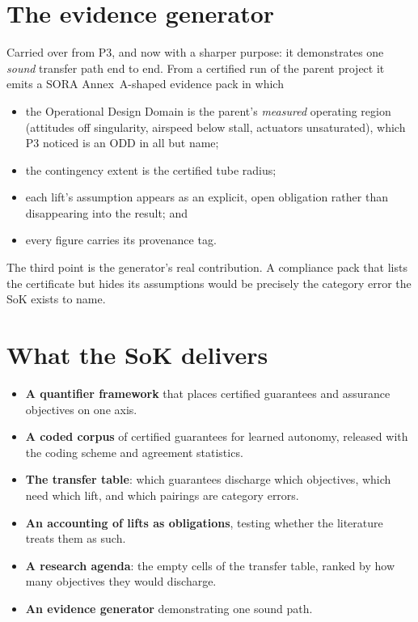 \documentclass[11pt,a4paper]{article}
\begin{document}
\section{The evidence generator}
Carried over from P3, and now with a sharper purpose: it demonstrates one
\emph{sound} transfer path end to end. From a certified run of the parent
project it emits a SORA Annex~A-shaped evidence pack in which
\begin{itemize}
\item the Operational Design Domain is the parent's \emph{measured} operating
  region (attitudes off singularity, airspeed below stall, actuators unsaturated),
  which P3 noticed is an ODD in all but name;
\item the contingency extent is the certified tube radius;
\item each lift's assumption appears as an explicit, open obligation rather than
  disappearing into the result; and
\item every figure carries its provenance tag.
\end{itemize}
The third point is the generator's real contribution. A compliance pack that
lists the certificate but hides its assumptions would be precisely the category
error the SoK exists to name.

\section{What the SoK delivers}
\begin{itemize}
\item \textbf{A quantifier framework} that places certified guarantees and
  assurance objectives on one axis.
\item \textbf{A coded corpus} of certified guarantees for learned autonomy,
  released with the coding scheme and agreement statistics.
\item \textbf{The transfer table}: which guarantees discharge which objectives,
  which need which lift, and which pairings are category errors.
\item \textbf{An accounting of lifts as obligations}, testing whether the
  literature treats them as such.
\item \textbf{A research agenda}: the empty cells of the transfer table,
  ranked by how many objectives they would discharge.
\item \textbf{An evidence generator} demonstrating one sound path.
\end{itemize}
\end{document}

